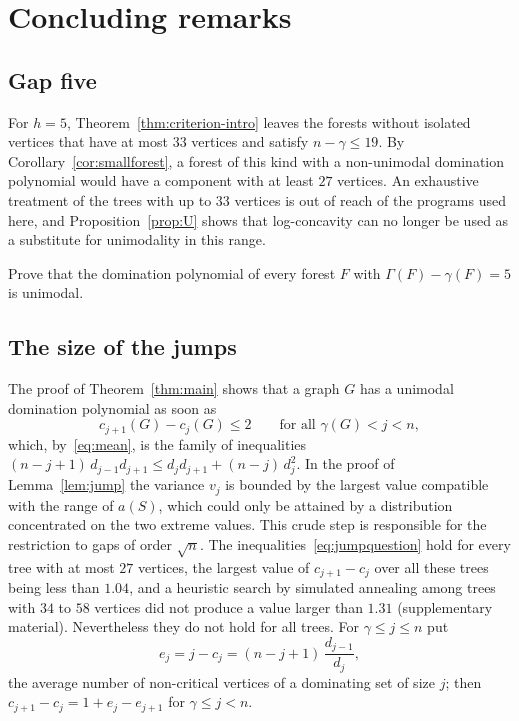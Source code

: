 \documentclass[smallextended,envcountsect,envcountsame]{svjour3}
\newcommand{\MinNonLC}{27}
\newcommand{\MaxOrder}{27}
\newcommand{\MaxJumpValue}{1.04}
\begin{document}
\section{Concluding remarks}\label{sec:remarks}

\subsection*{Gap five}
For $h=5$, Theorem~\ref{thm:criterion-intro} leaves the forests without
isolated vertices that have at most $33$ vertices and satisfy
$n-\gamma\le19$. By Corollary~\ref{cor:smallforest}, a forest of this kind
with a non-unimodal domination polynomial would have a component with at
least $\MinNonLC$ vertices. An exhaustive treatment of the trees with up to
$33$ vertices is out of reach of the programs used here, and
Proposition~\ref{prop:U} shows that log-concavity can no longer be used as
a substitute for unimodality in this range.

\begin{problem}
Prove that the domination polynomial of every forest $F$ with
$\Gamma(F)-\gamma(F)=5$ is unimodal.
\end{problem}

\subsection*{The size of the jumps}
The proof of Theorem~\ref{thm:main} shows that a graph $G$ has a unimodal
domination polynomial as soon as
\begingroup\small\begin{equation}\label{eq:jumpquestion}
  c_{j+1}(G)-c_j(G)\le 2\qquad\text{for all } \gamma(G)<j<n ,
\end{equation}\endgroup
which, by~\eqref{eq:mean}, is the family of inequalities
$(n-j+1)\,d_{j-1}d_{j+1}\le d_jd_{j+1}+(n-j)\,d_j^2$. In the proof of
Lemma~\ref{lem:jump} the variance $v_j$ is bounded by the largest value
compatible with the range of $a(S)$, which could only be attained by a
distribution concentrated on the two extreme values. This crude step is
responsible for the restriction to gaps of order $\sqrt n$.
The inequalities~\eqref{eq:jumpquestion} hold for every tree with at most
$\MaxOrder$ vertices, the largest value of $c_{j+1}-c_j$ over all these trees
being less than $\MaxJumpValue$, and a heuristic search by simulated annealing
among trees with $34$ to $58$ vertices did not produce a value larger than
$1.31$ (supplementary material). Nevertheless they do not hold for all
trees. For $\gamma\le j\le n$ put
\begingroup\small\[
  e_j=j-c_j=(n-j+1)\,\frac{d_{j-1}}{d_j},
\]\endgroup
the average number of non-critical vertices of a dominating set of size $j$;
then $c_{j+1}-c_j=1+e_j-e_{j+1}$ for $\gamma\le j<n$.
\end{document}
